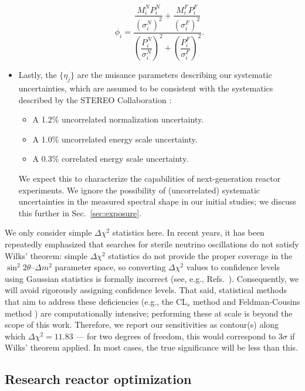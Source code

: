 \documentclass[prd, twocolumn, tightenlines, twoside, secnumarabic, superscriptaddress, preprintnumbers, nofootinbib, notitlepage]{revtex4-1}
\begin{document}
\begin{itemize}
    \begin{equation}
        \phi_i = \frac{ \dfrac{M_i^N P_i^N}{(\sigma_i^N)^2} + \dfrac{M_i^F P_i^F}{(\sigma_i^F)^2} }{\left(\dfrac{ P_i^N}{\sigma_i^N}\right)^2 + \left(\dfrac{ P_i^F}{\sigma_i^F}\right)^2 }.
    \end{equation}
    \item Lastly, the $\{\eta_j\}$ are the nuisance parameters describing our systematic uncertainties, which are assumed to be consistent with the systematics described by the STEREO Collaboration \cite{STEREO:2019ztb}:
    \begin{itemize}
        \item A 1.2\% uncorrelated normalization uncertainty.
        \item A 1.0\% uncorrelated energy scale uncertainty.
        \item A 0.3\% correlated energy scale uncertainty.
    \end{itemize}
    We expect this to characterize the capabilities of next-generation reactor experiments. We ignore the possibility of (uncorrelated) systematic uncertainties in the measured spectral shape in our initial studies; we discuss this further in Sec.~\ref{sec:exposure}.
\end{itemize}

We only consider simple $\Delta\chi^2$ statistics here. In recent years, it has been repeatedly emphasized that searches for sterile neutrino oscillations do not satisfy Wilks' theorem: simple $\Delta \chi^2$ statistics do not provide the proper coverage in the $\sin^2 2\theta$--$\Delta m^2$ parameter space, so converting $\Delta \chi^2$ values to confidence levels using Gaussian statistics is formally incorrect (see, e.g., Refs.~\cite{Agostini:2019jup,Coloma:2020ajw}). Consequently, we will avoid rigorously assigning confidence levels. That said, statistical methods that aim to address these deficiencies (e.g., the CL$_s$ method \cite{Qian:2014nha} and Feldman-Cousins method \cite{Feldman:1997qc}) are computationally intensive; performing these at scale is beyond the scope of this work. Therefore, we report our sensitivities as contour(s) along which $\Delta \chi^2 = 11.83$ --- for two degrees of freedom, this would correspond to $3\sigma$ if Wilks' theorem applied. In most cases, the true significance will be less than this.

\subsection{Research reactor optimization}
\label{sec:rr}
\end{document}

